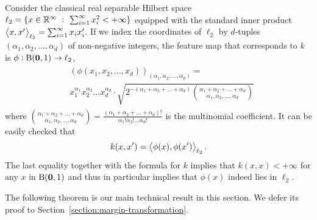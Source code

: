 Consider the classical real separable Hilbert space $\ell_2 = \{ x \in \mathbb{R}^\infty
~:~ \sum_{i=1}^\infty x_i^2 < + \infty \}$ equipped with the standard inner
product $\left\langle x, x' \right\rangle_{\ell_2} = \sum_{i=1}^\infty x_i x'_i$. If we index the
coordinates of $\ell_2$ by $d$-tuples $(\alpha_1, \alpha_2, \dots, \alpha_d)$ of
non-negative integers, the feature map that corresponds to $k$ is $\phi: \operatorname{B}(\mathbf{0},1)
\to \ell_2$,
\begin{align}
\begin{split}
&\left(\phi(x_1, x_2, \dots, x_d)\right)_{(\alpha_1, \alpha_2, \dots, \alpha_d)} = \\
& x_1^{\alpha_1} x_2^{\alpha_2} \dots x_d^{\alpha_d} \cdot \sqrt{2^{-(\alpha_1 + \alpha_2 + \dots + \alpha_d)} \binom{\alpha_1 + \alpha_2 + \dots + \alpha_d}{\alpha_1, \alpha_2, \dots, \alpha_d}}
\end{split}
\label{equation:phi}
\end{align}
where $\binom{\alpha_1 + \alpha_2 + \dots + \alpha_d}{\alpha_1, \alpha_2, \dots,
\alpha_d} = \frac{(\alpha_1 + \alpha_2 + \dots + \alpha_d)!}{\alpha_1! \alpha_2! \dots \alpha_d!}$ is the multinomial coefficient. It can be easily checked that
$$
k(x,x') = \left\langle \phi(x), \phi(x') \right\rangle_{\ell_2}.
$$
The last equality together with the formula for $k$ implies that $k(x,x) <
+\infty$ for any $x$ in $\operatorname{B}(\mathbf{0},1)$ and thus in particular implies that $\phi(x)$
indeed lies in $\ell_2$.

The following theorem is our main technical result in this section. We defer its
proof to Section~\ref{section:margin-transformation}.

